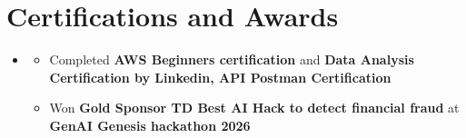 \documentclass[letterpaper,11pt]{article}
\newcommand{\resumeItem}[1]{
  \item\small{
    {#1 \vspace{-1pt}}
  }
}
\newcommand{\resumeSubHeadingListStart}{\begin{itemize}[leftmargin=0.0in, label={}]}
\newcommand{\resumeSubHeadingListEnd}{\end{itemize}}
\newcommand{\resumeItemListStart}{\begin{itemize}[leftmargin=0.15in, topsep=2pt, itemsep=1pt, parsep=0pt, partopsep=0pt]}
\newcommand{\resumeItemListEnd}{\end{itemize}\vspace{-1pt}}
\begin{document}
\section{Certifications and Awards}
    \resumeSubHeadingListStart
      \item[]
          \resumeItemListStart
            \resumeItem{Completed \textbf{AWS Beginners certification} and \textbf{Data Analysis Certification by Linkedin, API Postman Certification}}
            \resumeItem{Won \textbf{Gold Sponsor TD Best AI Hack to detect financial fraud} at \textbf{GenAI Genesis hackathon 2026}}
          
            
          \resumeItemListEnd
          \vspace{-1pt}
        
   \resumeSubHeadingListEnd
\end{document}
